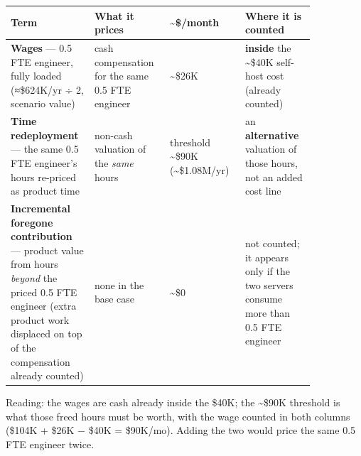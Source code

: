 \nopagebreak[4]
\begin{longtable}[]{@{}
  >{\raggedright\arraybackslash}p{0.2127\linewidth}
  >{\raggedright\arraybackslash}p{0.2127\linewidth}
  >{\raggedright\arraybackslash}p{0.2127\linewidth}
  >{\raggedright\arraybackslash}p{0.2127\linewidth}@{}}
\toprule\noalign{}
\begin{minipage}[b]{\linewidth}\raggedright
Term
\end{minipage} & \begin{minipage}[b]{\linewidth}\raggedright
What it prices
\end{minipage} & \begin{minipage}[b]{\linewidth}\raggedright
\textasciitilde\$/month
\end{minipage} & \begin{minipage}[b]{\linewidth}\raggedright
Where it is counted
\end{minipage} \\
\midrule\noalign{}
\endhead
\bottomrule\noalign{}
\endlastfoot
\textbf{Wages} --- 0.5 FTE engineer, fully loaded (≈\$624K/yr ÷ 2,
scenario value) & cash compensation for the same 0.5 FTE engineer &
\textasciitilde\$26K & \textbf{inside} the \textasciitilde\$40K
self-host cost (already counted) \\
\noalign{\label{tab:16.6}}
\textbf{Time redeployment} --- the same 0.5 FTE engineer's hours
re-priced as product time & non-cash valuation of the \emph{same} hours
& threshold \textasciitilde\$90K (\textasciitilde\$1.08M/yr) & an
\textbf{alternative} valuation of those hours, not an added cost line \\
\textbf{Incremental foregone contribution} --- product value from hours
\emph{beyond} the priced 0.5 FTE engineer (extra product work displaced
on top of the compensation already counted) & none in the base case &
\textasciitilde\$0 & not counted; it appears only if the two servers
consume more than 0.5 FTE engineer \\
\end{longtable}

Reading: the wages are cash already inside the \$40K; the
\textasciitilde\$90K threshold is what those freed hours must be worth,
with the wage counted in both columns (\$104K + \$26K − \$40K =
\$90K/mo). Adding the two would price the same 0.5 FTE engineer twice.

